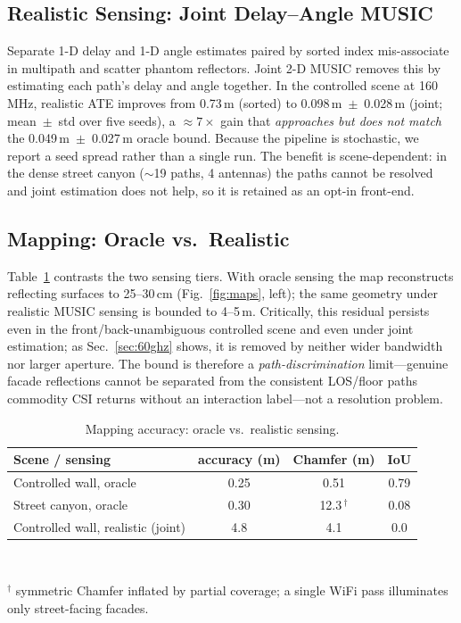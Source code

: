 \documentclass[journal]{IEEEtran}
\newcommand{\SI}[2]{#1\,#2}
\newcommand{\SIrange}[3]{#1--#2\,#3}
\begin{document}
\subsection{Realistic Sensing: Joint Delay--Angle MUSIC}
Separate 1-D delay and 1-D angle estimates paired by sorted index mis-associate in
multipath and scatter phantom reflectors. Joint 2-D MUSIC removes this by estimating
each path's delay and angle together. In the controlled scene at \SI{160}{MHz},
realistic ATE improves from \SI{0.73}{m} (sorted) to
\SI{0.098}{m}~$\pm$~\SI{0.028}{m} (joint; mean~$\pm$~std over five seeds), a
$\approx7\times$ gain that \emph{approaches but does not match} the
\SI{0.049}{m}~$\pm$~\SI{0.027}{m} oracle bound. Because the pipeline is stochastic,
we report a seed spread rather than a single run. The benefit is
scene-dependent: in the dense street canyon (\(\sim\)19 paths, 4 antennas) the paths
cannot be resolved and joint estimation does not help, so it is retained as an
opt-in front-end.

\subsection{Mapping: Oracle vs.\ Realistic}
Table~\ref{tab:map} contrasts the two sensing tiers. With oracle sensing the map
reconstructs reflecting surfaces to \SIrange{25}{30}{cm}
(Fig.~\ref{fig:maps}, left); the same geometry under realistic MUSIC sensing is
bounded to \SIrange{4}{5}{m}. Critically, this residual persists even in the
front/back-unambiguous controlled scene and even under joint estimation; as
Sec.~\ref{sec:60ghz} shows, it is removed by neither wider bandwidth nor larger
aperture. The bound is therefore a \emph{path-discrimination} limit---genuine
facade reflections cannot be separated from the consistent LOS/floor paths
commodity CSI returns without an interaction label---not a resolution problem.

\begin{table}[t]
\caption{Mapping accuracy: oracle vs.\ realistic sensing.}
\label{tab:map}
\centering
\small
\begin{tabular}{@{}lccc@{}}
\toprule
Scene / sensing & accuracy (m) & Chamfer (m) & IoU\\
\midrule
Controlled wall, oracle & 0.25 & 0.51 & 0.79\\
Street canyon, oracle & 0.30 & 12.3\,$^\dagger$ & 0.08\\
Controlled wall, realistic (joint) & 4.8 & 4.1 & 0.0\\
\bottomrule
\end{tabular}
\\[2pt]
\raggedright\footnotesize $^\dagger$ symmetric Chamfer inflated by partial
coverage; a single WiFi pass illuminates only street-facing facades.
\end{table}
\end{document}
